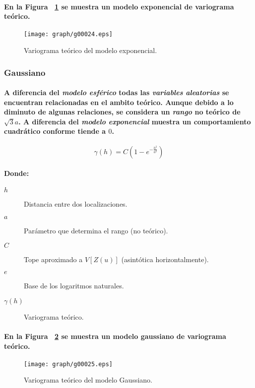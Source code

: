\paragraph{
En la Figura ~\ref{fig:VariogramaTeoricoModeloExponencial} se muestra un modelo exponencial de variograma teórico.
}
\begin{figure}[ht]
\centering
\texttt{[image: graph/g00024.eps]}
\caption[Variograma teórico del modelo exponencial.]{Variograma teórico del modelo exponencial.}
\label{fig:VariogramaTeoricoModeloExponencial}
\end{figure}

\subsubsection{Gaussiano}
\paragraph{
A diferencia del \emph{modelo esférico} todas las \emph{variables aleatorias} se encuentran relacionadas en el ambito teórico. Aunque debido a lo diminuto de algunas relaciones, se considera un \emph{rango} no teórico de $\sqrt{3}a$. A diferencia del \emph{modelo exponencial} muestra un comportamiento cuadrático conforme tiende a $0$.
}
\begin{equation}
\gamma(h) = C(1-e^{-\frac{h^2}{a^2}})
\end{equation}
\paragraph{
Donde:
}
\begin{description}
\item[$h$] Distancia entre dos localizaciones.
\item[$a$] Parámetro que determina el rango (no teórico).
\item[$C$] Tope aproximado a $V[Z(u)]$ (asintótica horizontalmente).
\item[$e$] Base de los logaritmos naturales.
\item[$\gamma(h)$] Variograma teórico.
\end{description}
\paragraph{
En la Figura ~\ref{fig:VariogramaTeoricoModeloGaussiano} se muestra un modelo gaussiano de variograma teórico.
}
\begin{figure}[ht]
\centering
\texttt{[image: graph/g00025.eps]}
\caption[Variograma teórico del modelo Gaussiano.]{Variograma teórico del modelo Gaussiano.}
\label{fig:VariogramaTeoricoModeloGaussiano}
\end{figure}



